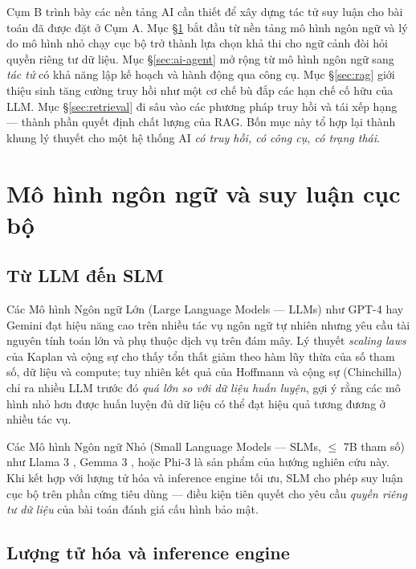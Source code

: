 Cụm B trình bày các nền tảng AI cần thiết để xây dựng tác tử suy luận cho bài toán đã được đặt ở Cụm A. Mục §\ref{sec:llm-slm} bắt đầu từ nền tảng mô hình ngôn ngữ và lý do mô hình nhỏ chạy cục bộ trở thành lựa chọn khả thi cho ngữ cảnh đòi hỏi quyền riêng tư dữ liệu. Mục §\ref{sec:ai-agent} mở rộng từ mô hình ngôn ngữ sang \textit{tác tử} có khả năng lập kế hoạch và hành động qua công cụ. Mục §\ref{sec:rag} giới thiệu sinh tăng cường truy hồi như một cơ chế bù đắp các hạn chế cố hữu của LLM. Mục §\ref{sec:retrieval} đi sâu vào các phương pháp truy hồi và tái xếp hạng --- thành phần quyết định chất lượng của RAG. Bốn mục này tổ hợp lại thành khung lý thuyết cho một hệ thống AI \textit{có truy hồi, có công cụ, có trạng thái}.

\section{Mô hình ngôn ngữ và suy luận cục bộ}
\label{sec:llm-slm}

\subsection{Từ LLM đến SLM}
\label{subsec:llm-to-slm}

Các Mô hình Ngôn ngữ Lớn (Large Language Models --- LLMs) như GPT-4 \cite{openai2023gpt4} hay Gemini \cite{google2023gemini} đạt hiệu năng cao trên nhiều tác vụ ngôn ngữ tự nhiên nhưng yêu cầu tài nguyên tính toán lớn và phụ thuộc dịch vụ trên đám mây. Lý thuyết \textit{scaling laws} của Kaplan và cộng sự \cite{kaplan2020scaling} cho thấy tổn thất giảm theo hàm lũy thừa của số tham số, dữ liệu và compute; tuy nhiên kết quả của Hoffmann và cộng sự (Chinchilla) \cite{hoffmann2022chinchilla} chỉ ra nhiều LLM trước đó \textit{quá lớn so với dữ liệu huấn luyện}, gợi ý rằng các mô hình nhỏ hơn được huấn luyện đủ dữ liệu có thể đạt hiệu quả tương đương ở nhiều tác vụ.

Các Mô hình Ngôn ngữ Nhỏ (Small Language Models --- SLMs, $\le$ 7B tham số) như Llama 3 \cite{meta2024llama32}, Gemma 3 \cite{google2025gemma3}, hoặc Phi-3 \cite{phi3_tech_report} là sản phẩm của hướng nghiên cứu này. Khi kết hợp với lượng tử hóa và inference engine tối ưu, SLM cho phép suy luận cục bộ trên phần cứng tiêu dùng --- điều kiện tiên quyết cho yêu cầu \textit{quyền riêng tư dữ liệu} của bài toán đánh giá cấu hình bảo mật.

\subsection{Lượng tử hóa và inference engine}
\label{subsec:quantization}


